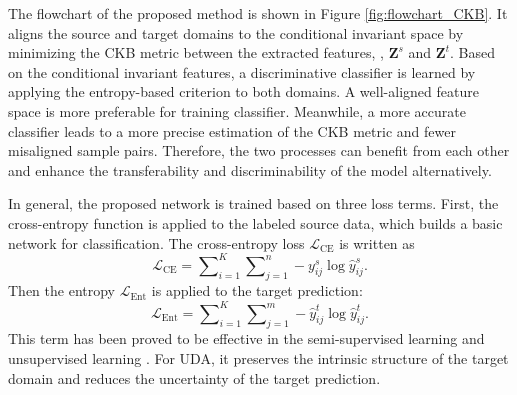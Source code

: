 \documentclass[final]{cvpr}
\newcommand{\MC}{\mathcal}
\newcommand{\MBF}{\mathbf}
\begin{document}
The flowchart of the proposed method is shown in Figure \ref{fig:flowchart_CKB}. It aligns the source and target domains to the conditional invariant space by minimizing the CKB metric between the extracted features, \ie, $\MBF{Z}^{s}$ and $\MBF{Z}^{t}$. Based on the conditional invariant features, a discriminative classifier is learned by applying the entropy-based criterion to both domains. A well-aligned feature space is more preferable for training classifier. Meanwhile, a more accurate classifier leads to a more precise estimation of the CKB metric and fewer misaligned sample pairs. Therefore, the two processes can benefit from each other and enhance the transferability and discriminability of the model alternatively.

In general, the proposed network is trained based on three loss terms. First, the cross-entropy function is applied to the labeled source data, which builds a basic network for classification. The cross-entropy loss $\MC{L}_{\text{CE}}$ is written as
\begin{equation*}\label{eq:loss_CE}
\MC{L}_{\text{CE}} = \sum\nolimits_{i=1}^{K} \sum\nolimits_{j=1}^{n} - y^s_{ij} \log \hat{y}^s_{ij}.
\end{equation*}
Then the entropy $\MC{L}_{\text{Ent}}$ is applied to the target prediction:
\begin{equation*}\label{eq:loss_Ent}
\MC{L}_{\text{Ent}} = \sum\nolimits_{i=1}^{K} \sum\nolimits_{j=1}^{m} - \hat{y}^t_{ij} \log \hat{y}^t_{ij}.
\end{equation*}
This term has been proved to be effective in the semi-supervised learning and unsupervised learning \cite{grandvalet2005semi}. For UDA, it preserves the intrinsic structure of the target domain and reduces the uncertainty of the target prediction.
\end{document}
